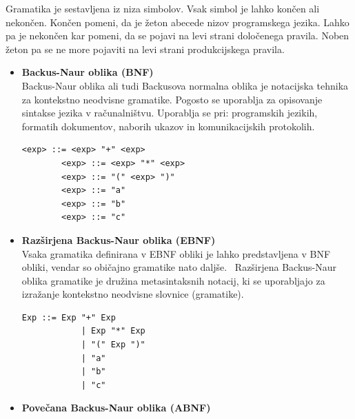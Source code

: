 \documentclass[a4paper, 12pt, tikz, border=5]{book}
\begin{document}
Gramatika je sestavljena iz niza simbolov. Vsak simbol je lahko končen ali nekončen. Končen pomeni, da je žeton abecede nizov programskega jezika. Lahko pa je nekončen kar pomeni, da se pojavi na levi strani določenega pravila. Noben žeton pa se ne more pojaviti na levi strani produkcijskega pravila.~\cite{Appel:2002}
\\

\begin{itemize}
\item \textbf{Backus-Naur oblika (BNF)} %
\\ 
Backus-Naur oblika ali tudi Backusova normalna oblika je notacijska tehnika za kontekstno neodvisne gramatike. Pogosto se uporablja za opisovanje sintakse jezika v računalništvu. Uporablja se pri: programskih jezikih, formatih dokumentov, naborih ukazov in komunikacijskih protokolih.~\cite{Backus:online}  

\begin{lstlisting}[caption={Primer preproste gramatike v BNF obliki},captionpos=b,label={lst:grammarBNFExample}, basicstyle=\small]
		<exp> ::= <exp> "+" <exp>
		<exp> ::= <exp> "*" <exp>
		<exp> ::= "(" <exp> ")"
		<exp> ::= "a"
		<exp> ::= "b"
		<exp> ::= "c"
\end{lstlisting}

\item \textbf{Razširjena Backus-Naur oblika (EBNF)} %
\\
Vsaka gramatika definirana v EBNF obliki je lahko predstavljena v BNF obliki, vendar so običajno gramatike nato daljše.~\cite{Extended22:online} 
Razširjena Backus-Naur oblika gramatike je družina metasintaksnih notacij, ki se uporabljajo za izražanje kontekstno neodvisne slovnice (gramatike). 

\begin{lstlisting}[caption={Primer preproste gramatike v EBNF obliki},captionpos=b,label={lst:grammarEBNFExample}, basicstyle=\small]
		Exp ::= Exp "+" Exp
			| Exp "*" Exp
			| "(" Exp ")"
			| "a"
			| "b"
			| "c"
\end{lstlisting}

\item \textbf{Povečana Backus-Naur oblika (ABNF)} %

\end{itemize}
\end{document}
